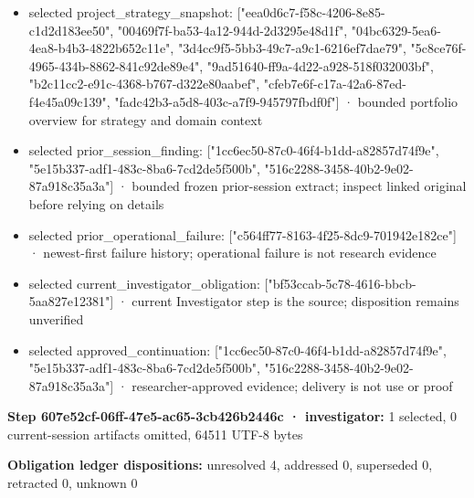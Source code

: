 \documentclass[11pt]{article}
\begin{document}
\begin{itemize}
\item selected project\_strategy\_snapshot: ["eea0d6c7-f58c-4206-8e85-c1d2d183ee50", "00469f7f-ba53-4a12-944d-2d3295e48d1f", "04bc6329-5ea6-4ea8-b4b3-4822b652c11e", "3d4cc9f5-5bb3-49c7-a9c1-6216ef7dae79", "5c8ce76f-4965-434b-8862-841c92de89e4", "9ad51640-ff9a-4d22-a928-518f032003bf", "b2c11cc2-e91c-4368-b767-d322e80aabef", "cfeb7e6f-c17a-42a6-87ed-f4e45a09c139", "fadc42b3-a5d8-403c-a7f9-945797fbdf0f"] · bounded portfolio overview for strategy and domain context
\item selected prior\_session\_finding: ["1cc6ec50-87c0-46f4-b1dd-a82857d74f9e", "5e15b337-adf1-483c-8ba6-7cd2de5f500b", "516c2288-3458-40b2-9e02-87a918c35a3a"] · bounded frozen prior-session extract; inspect linked original before relying on details
\item selected prior\_operational\_failure: ["c564ff77-8163-4f25-8dc9-701942e182ce"] · newest-first failure history; operational failure is not research evidence
\item selected current\_investigator\_obligation: ["bf53ccab-5c78-4616-bbcb-5aa827e12381"] · current Investigator step is the source; disposition remains unverified
\item selected approved\_continuation: ["1cc6ec50-87c0-46f4-b1dd-a82857d74f9e", "5e15b337-adf1-483c-8ba6-7cd2de5f500b", "516c2288-3458-40b2-9e02-87a918c35a3a"] · researcher-approved evidence; delivery is not use or proof
\end{itemize}
\textbf{Step 607e52cf-06ff-47e5-ac65-3cb426b2446c · investigator:} 1 selected, 0 current-session artifacts omitted, 64511 UTF-8 bytes\par
\textbf{Obligation ledger dispositions:} unresolved 4, addressed 0, superseded 0, retracted 0, unknown 0\par
\end{document}

